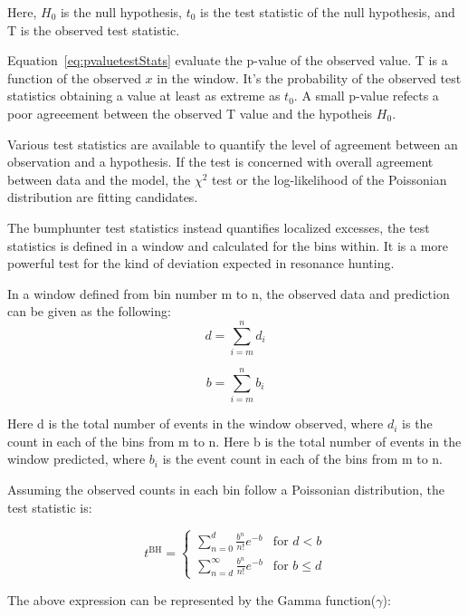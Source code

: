 Here, $H_0$ is the null hypothesis, $t_0$ is the test statistic of the null hypothesis, and T is the observed test statistic.

Equation~\ref{eq:pvaluetestStats} evaluate the p-value of the observed value. T is a function of the observed $x$ in the window. It's the probability of the observed test statistics obtaining a value at least as extreme as $t_{0}$. A small p-value refects a poor agreeement between the observed T value and the hypotheis $H_{0}$.

Various test statistics are available to quantify the level of agreement between an observation and a hypothesis. If the test is concerned with overall agreement between data and the model, the $\chi^{2}$ test or the log-likelihood of the Poissonian distribution are fitting candidates.

The bumphunter test statistics instead quantifies localized excesses, the test statistics is defined in a window and calculated for the bins within. It is a more powerful test for the kind of deviation expected in resonance hunting.

In a window defined from bin number m to n, the observed data and prediction can be given as the following: 
    \begin{equation}
         d= \sum_{i=m}^{n} d_i 
    \end{equation}

    
    \begin{equation}
         b= \sum_{i=m}^{n} b_i
    \end{equation}

    Here d is the total number of events in the window observed, where $d_i$ is the count in each of the bins from m to n. 
    Here b is the total number of events in the window predicted, where $b_i$ is the event count in each of the bins from m to n.
    
    Assuming the observed counts in each bin follow a Poissonian distribution, the test statistic is:

\begin{equation}
    t^{\textrm{BH}}=
    \begin{cases} \sum_{n=0}^{d} \frac{b^{n}}{n!} e^{-b} &  \textrm{for $d < b$}
    \\
    \sum_{n=d}^{\infty} \frac{b^n}{n!} e^{-b} &  \textrm{for $b \leq d$}
    \end{cases}
\end{equation}

    The above expression can be represented by the Gamma function($\gamma$): 

